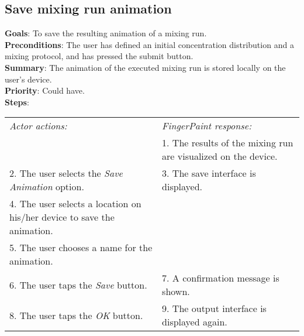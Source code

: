 \begin{appendices}
  \section{Save mixing run animation}
  \textbf{Goals}: To save the resulting animation of a mixing run.\\
  \textbf{Preconditions}: The user has defined an initial concentration distribution and a mixing protocol, and has pressed the submit button.\\
  \textbf{Summary}: The animation of the executed mixing run is stored locally on the user's device.\\
  \textbf{Priority}: Could have.\\
  \textbf{Steps}: \\
  \begin{tabular}{ p{} p{} }
  	\emph{Actor actions:} & \emph{FingerPaint response:} \\
	   & 1. The results of the mixing run are visualized on the device. \\
	 2. The user selects the \emph{Save Animation} option. & 3. The save interface is displayed.\\
	 4. The user selects a location on his/her device to save the animation. & \\
	 5. The user chooses a name for the animation. & \\
	 6. The user taps the \emph{Save} button. & 7. A confirmation message is shown. \\
	 8. The user taps the \emph{OK} button. & 9. The output interface is displayed again. \\
  \end{tabular}


\end{appendices}
